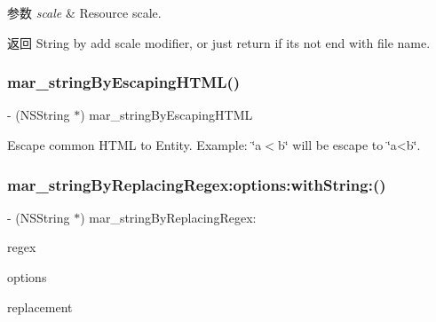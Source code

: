 \begin{DoxyParams}{参数}
{\em scale} & Resource scale. \\
\hline
\end{DoxyParams}
\begin{DoxyReturn}{返回}
String by add scale modifier, or just return if it\textquotesingle{}s not end with file name. 
\end{DoxyReturn}
\mbox{\label{category_n_s_string_07_m_a_r_e_x_08_a894e446839545b15af7943299ec983d4}} 
\subsubsection{\texorpdfstring{mar\+\_\+string\+By\+Escaping\+H\+T\+M\+L()}{mar\_stringByEscapingHTML()}}
{\footnotesize\ttfamily -\/ (N\+S\+String $\ast$) mar\+\_\+string\+By\+Escaping\+H\+T\+ML \begin{DoxyParamCaption}{ }\end{DoxyParamCaption}}

Escape common H\+T\+ML to Entity. Example\+: \char`\"{}a$<$b\char`\"{} will be escape to \char`\"{}a<b\char`\"{}. \mbox{\label{category_n_s_string_07_m_a_r_e_x_08_aba685f4086abefbe3b09625f6beccfad}} 
\subsubsection{\texorpdfstring{mar\+\_\+string\+By\+Replacing\+Regex\+:options\+:with\+String\+:()}{mar\_stringByReplacingRegex:options:withString:()}}
{\footnotesize\ttfamily -\/ (N\+S\+String $\ast$) mar\+\_\+string\+By\+Replacing\+Regex\+: \begin{DoxyParamCaption}\item[{(N\+S\+String $\ast$)}]{regex }\item[{options:(N\+S\+Regular\+Expression\+Options)}]{options }\item[{withString:(N\+S\+String $\ast$)}]{replacement }\end{DoxyParamCaption}}

